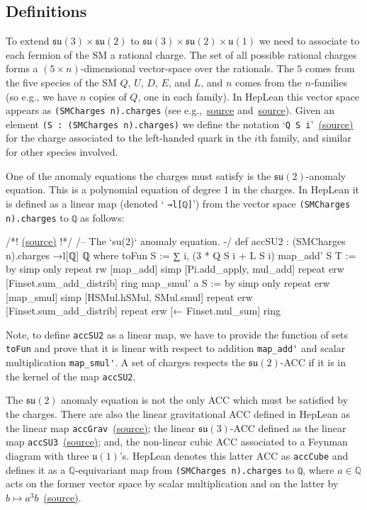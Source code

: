 \documentclass[a4paper, 11pt]{article}
\newcommand{\codeLink}[1]{
  \vspace{-0.5cm}\hfill\href{https://github.com/HEPLean/HepLean/blob/1b951994ae3d882242b02d23957ef1ee7fa05f3d/HepLean/#1}{(source)}
  }
\newcommand{\textLink}[1]{\href{https://github.com/HEPLean/HepLean/blob/1b951994ae3d882242b02d23957ef1ee7fa05f3d/HepLean/#1}{source}}
\newcommand{\textLinkB}[1]{\href{https://github.com/HEPLean/HepLean/blob/1b951994ae3d882242b02d23957ef1ee7fa05f3d/HepLean/#1}{(source)}}
\begin{document}
\subsection{Definitions}
To extend $\mathfrak{su}(3)\times \mathfrak{su}(2)$  to  $\mathfrak{su}(3)\times \mathfrak{su}(2) \times \mathfrak{u}(1)$ we need to associate to each fermion of the SM a rational charge.  
The set of all possible rational charges forms a $(5\times n)$-dimensional vector-space over the rationals. 
The $5$ comes from the five species of the SM $Q$, $U$, $D$, $E$, and $L$, and $n$ comes from the $n$-families (so e.g., we have $n$ copies of $Q$, one in each family). In HepLean this vector space appears as \lstinline|(SMCharges n).charges| 
(see e.g.,~\textLink{AnomalyCancellation/SM/Basic.lean\#L24} and~\textLink{AnomalyCancellation/Basic.lean\#L36}). Given an element  \lstinline|(S : (SMCharges n).charges)| we define the notation `\lstinline|Q S i|'~\textLinkB{AnomalyCancellation/SM/Basic.lean\#L65} for the charge associated to the left-handed quark in the $i$th family, and similar for other species involved. 

One of the anomaly equations the charges must satisfy is the $ \mathfrak{su}(2)$-anomaly equation. This is a polynomial equation of degree 1 in the charges. In HepLean it is defined as a linear map (denoted ` \lstinline|→l[ℚ]|') from the vector space \lstinline|(SMCharges n).charges| to \lstinline|ℚ| as follows:
\begin{code}
/*!\codeLink{AnomalyCancellation/SM/Basic.lean\#L118}!*/
/-- The `su(2)` anomaly equation. -/
def accSU2 : (SMCharges n).charges →l[ℚ] ℚ where
  toFun S := ∑ i, (3 * Q S i + L S i)
  map_add' S T := by
    simp only
    repeat rw [map_add]
    simp [Pi.add_apply, mul_add]
    repeat erw [Finset.sum_add_distrib]
    ring
  map_smul' a S := by
    simp only
    repeat erw [map_smul]
    simp [HSMul.hSMul, SMul.smul]
    repeat erw [Finset.sum_add_distrib]
    repeat erw [← Finset.mul_sum]
    ring
\end{code}
Note, to define \lstinline|accSU2| as a linear map, we have to provide the function of sets \lstinline|toFun| and prove that it is linear with respect to addition \lstinline|map_add'| and scalar multiplication \lstinline|map_smul'|. A set of charges respects the $\mathfrak{su}(2)$-ACC if it is in the kernel of the map \lstinline|accSU2|.

The $\mathfrak{su}(2)$ anomaly equation is not the only ACC which must be satisfied by the charges.
There are also the linear gravitational ACC defined in HepLean as the linear map \lstinline|accGrav|~\textLinkB{AnomalyCancellation/SM/Basic.lean\#L88}; the
linear $\mathfrak{su}(3)$-ACC defined as the linear map  \lstinline|accSU3|~\textLinkB{AnomalyCancellation/SM/Basic.lean\#L148}; and, the non-linear
cubic ACC associated to a Feynman diagram with three  $\mathfrak{u}(1)$'s. HepLean denotes this latter ACC 
 as \lstinline|accCube| and defines it as a $\mathbb{Q}$-equivariant map from
\lstinline|(SMCharges n).charges| to \lstinline|ℚ|, where $a\in \mathbb{Q}$ acts on the former vector
space by scalar multiplication and on the latter by $b\mapsto a^3 b$~\textLinkB{AnomalyCancellation/SM/Basic.lean\#L306}.
\end{document}
